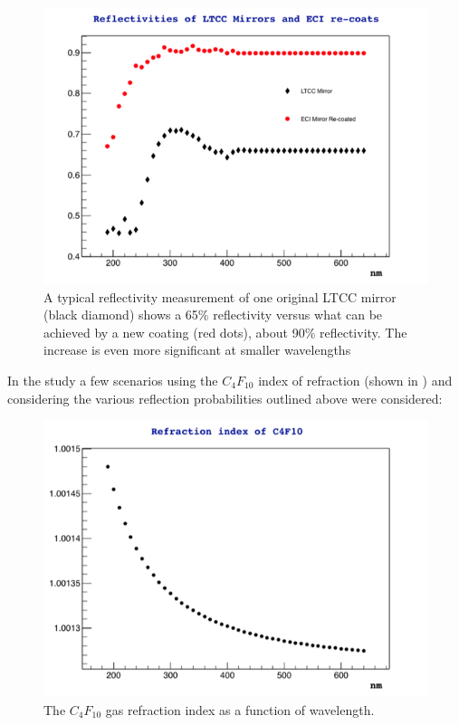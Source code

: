 \begin{figure}
	\centering
	\includegraphics[width=1.0\columnwidth,keepaspectratio]{img/reflectivityGain.png}
	\caption{A typical reflectivity measurement of one original LTCC mirror (black diamond) shows a 65\% reflectivity versus what can be achieved
		      by a new coating (red dots), about 90\% reflectivity. The increase is even more significant at smaller wavelengths }
	\label{fig:reflectivityGain}
\end{figure}

In the study a few scenarios using the $C_4F_{10}$ index of refraction (shown in )
and considering the various reflection probabilities outlined above  were considered:

\begin{figure}
	\centering
	\includegraphics[width=1.0\columnwidth,keepaspectratio]{img/c4f10RefrIndex.png}
	\caption{The $C_4F_{10}$ gas refraction index as a function of wavelength.}
	\label{fig:c4f10RefrIndex}
\end{figure}

